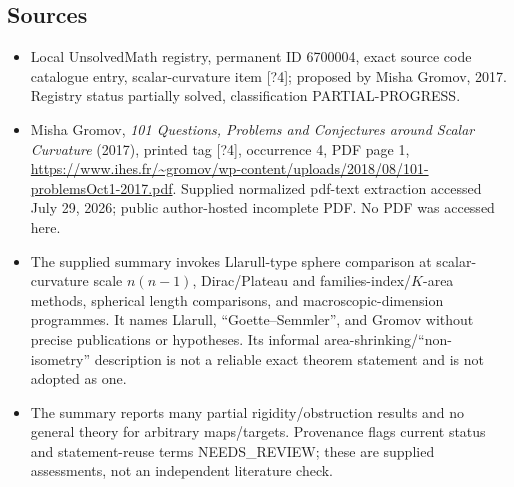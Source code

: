 \documentclass[11pt]{article}
\begin{document}
\subsection{Sources}
\begin{itemize}
\item Local UnsolvedMath registry, permanent ID 6700004, exact source code catalogue entry, scalar-curvature item [?4]; proposed by Misha Gromov, 2017. Registry status partially solved, classification PARTIAL-PROGRESS.
\item Misha Gromov, \emph{101 Questions, Problems and Conjectures around Scalar Curvature} (2017), printed tag [?4], occurrence 4, PDF page 1, \url{https://www.ihes.fr/~gromov/wp-content/uploads/2018/08/101-problemsOct1-2017.pdf}. Supplied normalized pdf-text extraction accessed July 29, 2026; public author-hosted incomplete PDF. No PDF was accessed here.
\item The supplied summary invokes Llarull-type sphere comparison at scalar-curvature scale $n(n-1)$, Dirac/Plateau and families-index/$K$-area methods, spherical length comparisons, and macroscopic-dimension programmes. It names Llarull, ``Goette--Semmler'', and Gromov without precise publications or hypotheses. Its informal area-shrinking/``non-isometry'' description is not a reliable exact theorem statement and is not adopted as one.
\item The summary reports many partial rigidity/obstruction results and no general theory for arbitrary maps/targets. Provenance flags current status and statement-reuse terms NEEDS\_REVIEW; these are supplied assessments, not an independent literature check.
\end{itemize}
\end{document}

